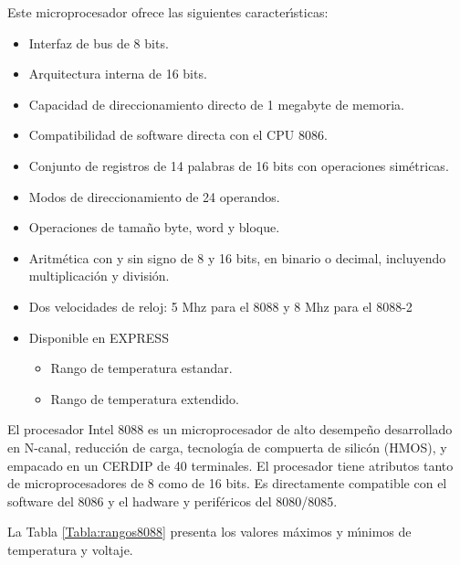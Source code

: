 Este microprocesador ofrece las siguientes caracter\'{\i}sticas:

\begin{itemize}
\item Interfaz de bus de 8 bits.
\item Arquitectura interna de 16 bits.
\item Capacidad de direccionamiento directo de 1 megabyte de memoria.
\item Compatibilidad de software directa con el CPU 8086.
\item Con\-jun\-to de re\-gis\-tros de 14 pa\-la\-bras de 16 bits con o\-pe\-ra\-cio\-nes %
si\-m\'e\-tri\-cas.
\item Modos de direccionamiento de 24 operandos.
\item Operaciones de tama\~no byte, word y bloque.
\item Aritm\'etica con y sin signo de 8 y 16 bits, en binario o decimal, incluyendo %
multiplicaci\'on y divisi\'on.
\item Dos velocidades de reloj: 5 Mhz para el 8088 y 8 Mhz para el 8088-2
\item Disponible en EXPRESS
\begin{itemize}
\item Rango de temperatura estandar.
\item Rango de temperatura extendido.
\end{itemize}
\end{itemize}

El procesador Intel 8088 es un microprocesador de alto desempe\~no desarrollado en N-canal, %
reducci\'on de carga, tecnolog\'{\i}a de compuerta de silic\'on (HMOS), y empacado en un CERDIP %
de 40 terminales. El procesador tiene atributos tanto de microprocesadores de 8 como de 16 bits. %
Es directamente compatible con el software del 8086 y el hadware y perif\'ericos del 8080/8085.

La Tabla \ref{Tabla:rangos8088} presenta los valores m\'aximos y m\'{\i}nimos de temperatura y %
voltaje.

